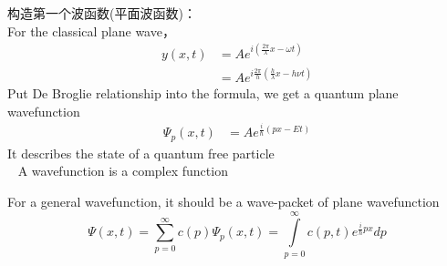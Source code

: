 \begin{frame}
    \frametitle{}
    构造第一个波函数(平面波函数)：~\\
    For the classical plane wave，
        \begin{equation*}
            \begin{split}
                y(x,t)&=A e^{i(\frac{2\pi}{\lambda}x-\omega t)} \\
                    & = A e^{i\frac{2\pi}{h}(\frac{h}{\lambda}x-h\nu t)}
            \end{split} 
        \end{equation*}
        Put De Broglie relationship into the formula, we get a quantum plane wavefunction
        \begin{equation*}
            \begin{split}
                \Psi_p(x,t)&=A e^{\frac{i}{\hbar}(px-Et)}
            \end{split} 
         \end{equation*}
         It describes the state of a quantum free particle\\
         \Note ~ A wavefunction is a complex function 
\end{frame}

\begin{frame}
         For a general wavefunction, it should be a wave-packet of plane wavefunction
         \begin{equation*}
                \Psi(x,t)=\sum\limits_{p=0} ^{\infty} c(p)\Psi_p(x,t) = \int\limits_{p=0} ^{\infty} c(p,t) e^{\frac{i}{\hbar}px}dp
         \end{equation*}
\end{frame}


